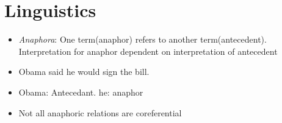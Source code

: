 \documentclass[a4paper]{article}
\begin{document}
\section{Linguistics}
\begin{itemize}
    \item \textit{Anaphora}: One term(anaphor) refers to another term(antecedent). Interpretation for anaphor dependent on interpretation of antecedent
    \item Obama said he would sign the bill.
    \item Obama: Antecedant. he: anaphor
    \item Not all anaphoric relations are coreferential
\end{itemize}
\end{document}
